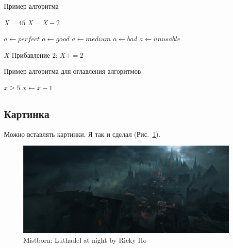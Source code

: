 \documentclass[12pt,a4paper]{article}
\begin{document}
\begin{algorithm}
    \caption{Пример алгоритма}\label{alg:Example1}
    \begin{algorithmic}[1]
        \State $ X = 45 $ 
            \State $ X = X - 2 $
            \State {}

             
                \State $ a \gets perfect $
                \State $ a \gets good $
                \State $ a \gets medium $
                \State $ a \gets bad $
                \Else
                \State $ a \gets unusable $
                \EndIf
            \EndWhile

            \State \Return $ X $
            \BeginBlock Прибавление 2:
                \State $ X += 2 $
            \EndBlock
        \EndFor
    \end{algorithmic}
\end{algorithm}

\begin{algorithm}
    \caption{Пример алгоритма для оглавления алгоритмов}\label{alg:Example2}
    \begin{algorithmic}[1]
        \Require $ x \ge 5 $ 
        \Statex
        \State $ x \gets x - 1 $
        \EndWhile
    \end{algorithmic}
\end{algorithm}

\listofalgorithms


\subsection{Картинка}

Можно вставлять картинки. Я так и сделал (Рис.~\ref{pic:luthadel}).
\begin{figure}[!h]
	\centering
	\includegraphics[width=1.0\textwidth]{pic/ricky-ho-mistborn-luthadel-city-rickyho}
	\caption{Mistborn: Luthadel at night by Ricky Ho}
	\label{pic:luthadel}
\end{figure}
\end{document}
